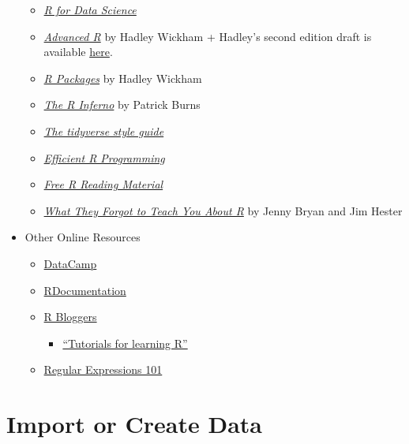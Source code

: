 \documentclass[
]{book}
\providecommand{\tightlist}{%
  \setlength{\itemsep}{0pt}\setlength{\parskip}{0pt}}
\begin{document}
\begin{itemize}
  \begin{itemize}
  \tightlist
  \item
    \href{http://r4ds.had.co.nz/}{\emph{R for Data Science}}
  \item
    \href{http://adv-r.had.co.nz/}{\emph{Advanced R}} by Hadley Wickham
    + Hadley's second edition draft is available \href{https://adv-r.hadley.nz/}{here}.
  \item
    \href{http://r-pkgs.had.co.nz/}{\emph{R Packages}} by Hadley Wickham
  \item
    \href{http://www.burns-stat.com/pages/Tutor/R_inferno.pdf}{\emph{The R Inferno}} by Patrick Burns
  \item
    \href{http://style.tidyverse.org/}{\emph{The tidyverse style guide}}
  \item
    \href{https://bookdown.org/csgillespie/efficientR/}{\emph{Efficient R Programming}}
  \item
    \href{https://committedtotape.shinyapps.io/freeR/}{\emph{Free R Reading Material}}
  \item
    \href{https://rstats.wtf/}{\emph{What They Forgot to Teach You About R}} by Jenny Bryan and Jim Hester
  \end{itemize}
\item
  Other Online Resources

  \begin{itemize}
  \tightlist
  \item
    \href{https://www.datacamp.com/}{DataCamp}
  \item
    \href{https://www.rdocumentation.org/}{RDocumentation}
  \item
    \href{https://www.r-bloggers.com/how-to-learn-r-2/}{R Bloggers}

    \begin{itemize}
    \tightlist
    \item
      \href{https://www.r-bloggers.com/how-to-learn-r-2/}{``Tutorials for learning R''}
    \end{itemize}
  \item
    \href{https://regex101.com/}{Regular Expressions 101}
  \end{itemize}
\end{itemize}

\hypertarget{import-or-create-data}{%
\chapter{Import or Create Data}\label{import-or-create-data}}
\end{document}
